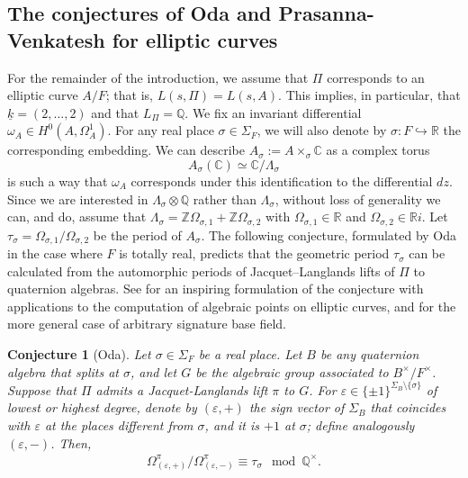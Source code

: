 \documentclass{amsart}
\newtheorem{conjecture}[theorem]{Conjecture}
\theoremstyle{definition}
\theoremstyle{remark}
\numberwithin{equation}{section}
\newcommand{\Z}{{\mathbb Z}}
\newcommand{\Q}{{\mathbb Q}}
\newcommand{\C}{{\mathbb C}}
\newcommand{\R}{{\mathbb R}}
\begin{document}
\subsection{The conjectures of Oda and Prasanna-Venkatesh for elliptic curves}\label{sec: oda and PV} For the remainder of the introduction, we assume that $\Pi$ corresponds to an elliptic curve $A/F$; that is, $L(s, \Pi) = L(s, A)$. This implies, in particular, that  $\underline{k}=(2,\dots,2)$  and that $L_\Pi=\Q$. We fix an invariant differential $\omega_A\in H^0(A,\Omega_A^1)$. For any real place $\sigma\in\Sigma_F$, we will also denote by $\sigma\colon F\hookrightarrow\R$ the corresponding embedding. We can describe $A_{\sigma}:=A\times_{\sigma}\C$ as a complex torus
\[
A_\sigma(\C)\simeq \C/\Lambda_\sigma
\]
is such a way that $\omega_A$ corresponds under this identification to the differential $dz$. Since we are interested in $\Lambda_\sigma\otimes\Q$ rather than $\Lambda_\sigma$, without loss of generality we can, and do, assume that $ \Lambda_\sigma=\Z\Omega_{\sigma,1}+\Z\Omega_{\sigma,2}$ with $\Omega_{\sigma,1}\in\R$ and $\Omega_{\sigma,2}\in \R i$. Let $\tau_\sigma=\Omega_{\sigma,1}/\Omega_{\sigma,2}$ be the period of $A_\sigma$. The following conjecture, formulated by Oda \cite{oda83} in the case where $F$ is totally real, predicts that the geometric period $\tau_\sigma$ can be calculated from the automorphic periods of Jacquet--Langlands lifts of $\Pi$ to quaternion algebras. See \cite{DL} for an inspiring formulation of the conjecture with applications to the computation of algebraic points on elliptic curves, and \cite{GMS} for the more general case of arbitrary signature base field.
\begin{conjecture}[Oda]\label{Odaconj}
    Let $\sigma\in\Sigma_F$ be a real place. Let $B$ be any quaternion algebra that splits at $\sigma$, and let $G$ be the algebraic group associated to $B^\times/F^\times$. Suppose that $\Pi$ admits a Jacquet-Langlands lift $\pi$ to $G$. For $\varepsilon\in \{\pm1\}^{\Sigma_B\setminus\{\sigma\}}$  of lowest or highest degree, denote by $(\varepsilon,+)$ the sign vector of $\Sigma_B$ that coincides with $\varepsilon$ at the places different from $\sigma$, and it is $+1$ at $\sigma$; define analogously $(\varepsilon,-)$. Then,
    \begin{align}\label{eq:oda conj}
    \Omega^\pi_{(\varepsilon,+)}/\Omega^\pi_{(\varepsilon,-)}\equiv\tau_\sigma\mod\Q^\times.
    \end{align}
\end{conjecture}
\end{document}
